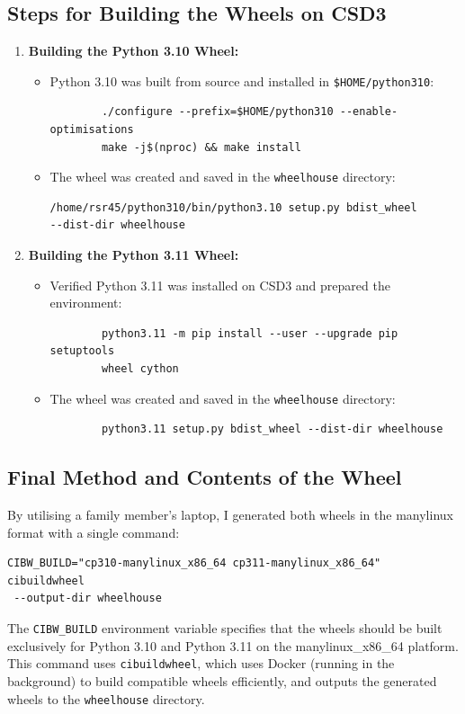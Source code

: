 \documentclass[a4paper,12pt]{article}
\begin{document}
\subsection{Steps for Building the Wheels on CSD3}
\begin{enumerate}
    \item \textbf{Building the Python 3.10 Wheel:}
    \begin{itemize}
        \item Python 3.10 was built from source and installed in \texttt{\$HOME/python310}:
        \begin{verbatim}
        ./configure --prefix=$HOME/python310 --enable-optimisations
        make -j$(nproc) && make install
        \end{verbatim}
        \item The wheel was created and saved in the \texttt{wheelhouse} directory:
        \begin{verbatim}
/home/rsr45/python310/bin/python3.10 setup.py bdist_wheel 
--dist-dir wheelhouse
        \end{verbatim}
    \end{itemize}

    \item \textbf{Building the Python 3.11 Wheel:}
    \begin{itemize}
        \item Verified Python 3.11 was installed on CSD3 and prepared the environment:
        \begin{verbatim}
        python3.11 -m pip install --user --upgrade pip setuptools 
        wheel cython
        \end{verbatim}
        \item The wheel was created and saved in the \texttt{wheelhouse} directory:
        \begin{verbatim}
        python3.11 setup.py bdist_wheel --dist-dir wheelhouse
        \end{verbatim}
    \end{itemize}
\end{enumerate}


\subsection{Final Method and Contents of the Wheel}

By utilising a family member's laptop, I generated both wheels in the manylinux format with a single command:
\begin{verbatim}
CIBW_BUILD="cp310-manylinux_x86_64 cp311-manylinux_x86_64" cibuildwheel
 --output-dir wheelhouse
\end{verbatim}
The \texttt{CIBW\_BUILD} environment variable specifies that the wheels should be built exclusively for Python 3.10 and Python 3.11 on the manylinux\_x86\_64 platform. This command uses \texttt{cibuildwheel}, which uses Docker (running in the background) to build compatible wheels efficiently, and outputs the generated wheels to the \texttt{wheelhouse} directory. 
\end{document}
